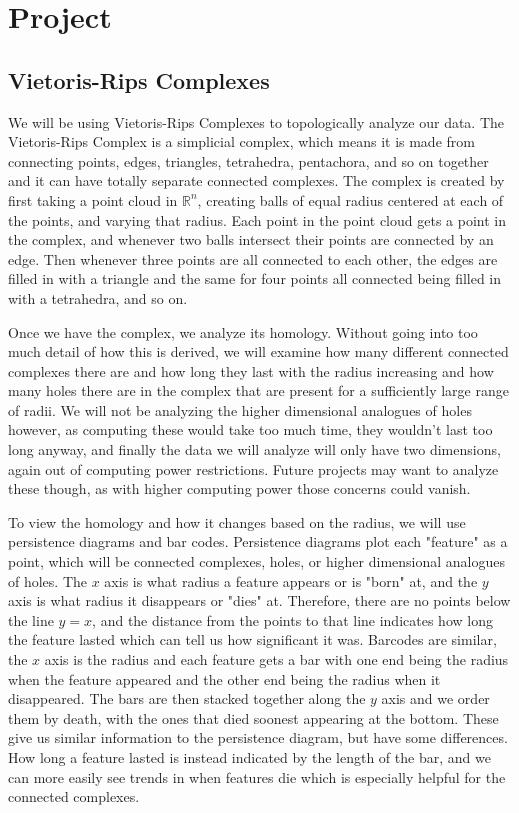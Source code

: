 \documentclass[12pt]{report}
\begin{document}
\clearpage
\section*{Project}
\subsection*{Vietoris-Rips Complexes}
We will be using Vietoris-Rips Complexes to topologically analyze our data. The Vietoris-Rips Complex is a simplicial complex, which means it is made from connecting points, edges, triangles, tetrahedra, pentachora, and so on together and it can have totally separate connected complexes. The complex is created by first taking a point cloud in $\mathbb{R}^n$, creating balls of equal radius centered at each of the points, and varying that radius. Each point in the point cloud gets a point in the complex, and whenever two balls intersect their points are connected by an edge. Then whenever three points are all connected to each other, the edges are filled in with a triangle and the same for four points all connected being filled in with a tetrahedra, and so on. 

Once we have the complex, we analyze its homology. Without going into too much detail of how this is derived, we will examine how many different connected complexes there are and how long they last with the radius increasing and how many holes there are in the complex that are present for a sufficiently large range of radii. We will not be analyzing the higher dimensional analogues of holes however, as computing these would take too much time, they wouldn't last too long anyway, and finally the data we will analyze will only have two dimensions, again out of computing power restrictions. Future projects may want to analyze these though, as with higher computing power those concerns could vanish. 

To view the homology and how it changes based on the radius, we will use persistence diagrams and bar codes. Persistence diagrams plot each "feature" as a point, which will be connected complexes, holes, or higher dimensional analogues of holes. The $x$ axis is what radius a feature appears or is "born" at, and the $y$ axis is what radius it disappears or "dies" at. Therefore, there are no points below the line $y=x$, and the distance from the points to that line indicates how long the feature lasted which can tell us how significant it was. Barcodes are similar, the $x$ axis is the radius and each feature gets a bar with one end being the radius when the feature appeared and the other end being the radius when it disappeared. The bars are then stacked together along the $y$ axis and we order them by death, with the ones that died soonest appearing at the bottom. These give us similar information to the persistence diagram, but have some differences. How long a feature lasted is instead indicated by the length of the bar, and we can more easily see trends in when features die which is especially helpful for the connected complexes.
\end{document}
